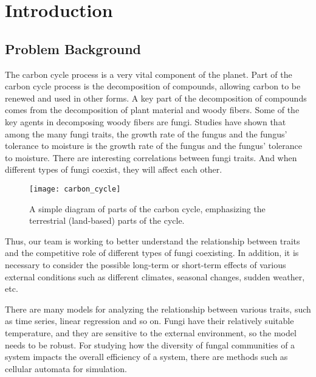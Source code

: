 \documentclass{mcmthesis}
\begin{document}
\maketitle
\tableofcontents
\newpage

\section{Introduction}
\subsection{Problem Background}

The carbon cycle process is a very vital component of the planet. Part of the carbon cycle process is the decomposition of compounds, allowing carbon to be renewed and used in other forms. A key part of the decomposition of compounds comes from the decomposition of plant material and woody fibers. Some of the key agents in decomposing woody fibers are fungi. Studies have shown that among the many fungi traits, the growth rate of the fungus and the fungus' tolerance to moisture is the growth rate of the fungus and the fungus' tolerance to moisture. There are interesting correlations between fungi traits. And when different types of fungi coexist, they will affect each other. 

\begin{figure}[H]
\small
\centering
\texttt{[image: carbon\_cycle]}
\caption{A simple diagram of parts of the carbon cycle, emphasizing the terrestrial (land-based) parts of the cycle.\cite{carbon_cycle}}
\label{carbon_cycle}
\end{figure}

Thus, our team is working to better understand the relationship between traits and the competitive role of different types of fungi coexisting. In addition, it is necessary to consider the possible long-term or short-term effects of various external conditions such as different climates, seasonal changes, sudden weather, etc. 

There are many models for analyzing the relationship between various traits, such as time series, linear regression and so on. Fungi have their relatively suitable temperature, and they are sensitive to the external environment, so the model needs to be robust. For studying how the diversity of fungal communities of a system impacts the overall efficiency of a system, there are methods such as cellular automata for simulation. 
\end{document}
